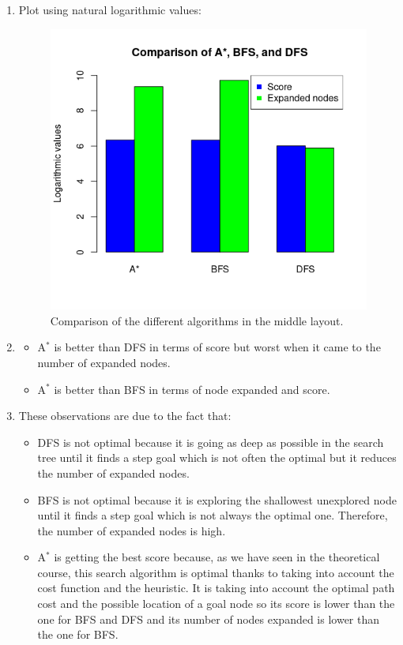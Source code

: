 \documentclass{article}
\begin{document}
\begin{enumerate}[label=\alph*.,leftmargin=1.35em]
    \item Plot using natural logarithmic values:\\
    \begin{figure}[H]
        \centering
        \includegraphics[scale=0.7]{q4_plot.png} 
        \caption{Comparison of the different algorithms in the middle layout.}
    \end{figure}
    \item
        \begin{itemize}
            \item A$^*$ is better than DFS in terms of score but worst when it came to the number of expanded nodes.
            \item A$^*$ is better than BFS in terms of node expanded and score.
        \end{itemize}
    \item These observations are due to the fact that:
        \begin{itemize}
            \item DFS is not optimal because it is going as deep as possible in the search tree until it finds a step goal which is not often the optimal but it reduces the number of expanded nodes.
            \item BFS is not optimal because it is exploring the shallowest unexplored node until it finds a step goal which is not always the optimal one. Therefore, the number of expanded nodes is high.
            \item A$^*$ is getting the best score because, as we have seen in the theoretical course, this search algorithm is optimal thanks to taking into account the cost function and the heuristic. It is taking into account the optimal path cost and the possible location of a goal node so its score is lower than the one for BFS and DFS and its number of nodes expanded is lower than the one for BFS.
        \end{itemize}
\end{enumerate}


\end{document}

